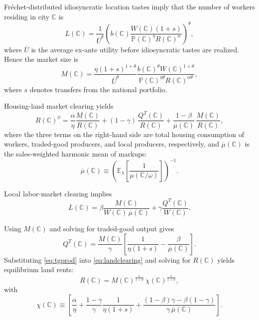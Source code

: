 Fréchet-distributed idiosyncratic location tastes imply that the number of workers residing in city $\mathbb{C}$ is
\begin{equation}\label{eq:laborsupp}
    L(\mathbb{C}) = \frac{1}{\overline{U}^{\theta}} \left( b(\mathbb{C}) \frac{W(\mathbb{C})(1+s)}{\mathbb{P}(\mathbb{C})^{\eta} R(\mathbb{C})^{\alpha}} \right)^{\theta},
\end{equation}
where $\overline{U}$ is the average ex-ante utility before idiosyncratic tastes are realized. Hence the market size is
\begin{equation}\label{eq:mquant}
	M(\mathbb{C}) = \frac{\eta (1+s)^{1+\theta}}{\overline{U}^{\theta}} \frac{b(\mathbb{C})^{\theta} W(\mathbb{C})^{1+\theta}}{\mathbb{P}(\mathbb{C})^{\eta \theta} R(\mathbb{C})^{\alpha \theta}},
\end{equation}
where $s$ denotes transfers from the national portfolio.

Housing-land market clearing yields
\begin{equation}\label{eq:landclearing}
	R(\mathbb{C})^{\phi} 
 = \frac{\alpha}{\eta} \frac{M(\mathbb{C})}{R(\mathbb{C})} 
 + (1-\gamma)\, \frac{Q^T(\mathbb{C})}{R(\mathbb{C})} 
 + \frac{1-\beta}{\overline{\mu}(\mathbb{C})}\, \frac{M(\mathbb{C})}{R(\mathbb{C})},
\end{equation}
where the three terms on the right-hand side are total housing consumption of workers, traded-good producers, and local producers, respectively, and $\overline{\mu}(\mathbb{C})$ is the sales-weighted harmonic mean of markups:
\begin{equation*}
    \overline{\mu}(\mathbb{C}) \equiv \left(\mathbb{E}_\lambda\!\left[\frac{1}{\mu(\mathbb{C}/\omega)}\right]\right)^{-1}.
\end{equation*}

Local labor-market clearing implies
\begin{equation*}
	L(\mathbb{C}) = \beta \frac{M(\mathbb{C})}{W(\mathbb{C})\, \overline{\mu}(\mathbb{C})}
	+ \gamma \frac{Q^T(\mathbb{C})}{W(\mathbb{C})}.
\end{equation*}

Using $M(\mathbb{C})$ and solving for traded-good output gives
\begin{equation}\label{eq:tgprod}
	Q^T(\mathbb{C}) = \frac{M(\mathbb{C})}{\gamma} \left[ \frac{1}{\eta(1+s)} - \frac{\beta}{\overline{\mu}(\mathbb{C})} \right].
\end{equation}
Substituting \eqref{eq:tgprod} into \eqref{eq:landclearing} and solving for $R(\mathbb{C})$ yields equilibrium land rents:
\begin{equation}\label{eq:rquant}
	R(\mathbb{C}) = M(\mathbb{C})^{\frac{1}{1+\phi}}\, \chi(\mathbb{C})^{\frac{1}{1+\phi}},
\end{equation}
with
\begin{equation*}
	\chi(\mathbb{C}) \equiv \left[ \frac{\alpha}{\eta} 
	+ \frac{1-\gamma}{\gamma} \frac{1}{\eta(1+s)} 
	+ \frac{(1-\beta)\gamma - \beta(1-\gamma)}{\gamma\, \overline{\mu}(\mathbb{C})} \right].
\end{equation*}

